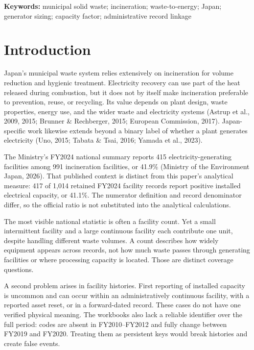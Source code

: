 \documentclass[11pt,letterpaper]{article}
\begin{document}
\vspace{0.15em}
\noindent\textbf{Keywords:} municipal solid waste; incineration; waste-to-energy;
Japan; generator sizing; capacity factor; administrative record linkage

\section{Introduction}

Japan's municipal waste system relies extensively on incineration for volume
reduction and hygienic treatment. Electricity recovery can use part of the heat
released during combustion, but it does not by itself make incineration
preferable to prevention, reuse, or recycling. Its value depends on plant
design, waste properties, energy use, and the wider waste and electricity
systems (Astrup et al., 2009, 2015; Brunner \& Rechberger, 2015; European
Commission, 2017). Japan-specific work likewise extends beyond a binary label
of whether a plant generates electricity (Uno, 2015; Tabata \& Tsai, 2016;
Yamada et al., 2023).

The Ministry's FY2024 national summary reports 415 electricity-generating
facilities among 991 incineration facilities, or 41.9\% (Ministry of the
Environment Japan, 2026). That published context is distinct from this paper's
analytical measure: 417 of 1,014 retained FY2024 facility records report
positive installed electrical capacity, or 41.1\%. The numerator definition and
record denominator differ, so the official ratio is not substituted into the
analytical calculations.

The most visible national statistic is often a facility count. Yet a small
intermittent facility and a large continuous facility each contribute one unit,
despite handling different waste volumes. A count describes how widely
equipment appears across records, not how much waste passes through generating
facilities or where processing capacity is located. Those are distinct coverage
questions.

A second problem arises in facility histories. First reporting of installed
capacity is uncommon and can occur within an administratively continuous
facility, with a reported asset reset, or in a forward-dated record. These cases
do not have one verified physical meaning. The workbooks also lack a reliable
identifier over the full period: codes are absent in FY2010--FY2012 and fully
change between FY2019 and FY2020. Treating them as persistent keys would break
histories and create false events.
\end{document}
